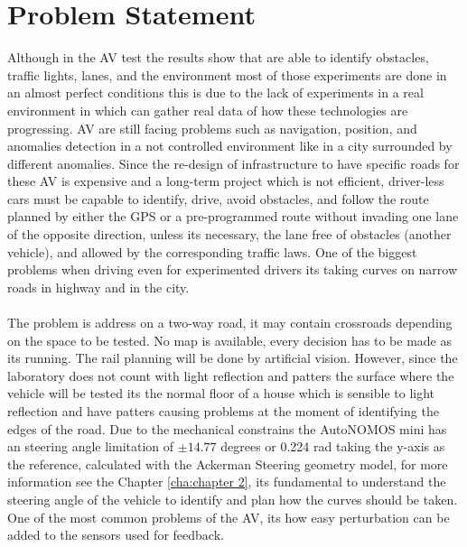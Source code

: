 \section{Problem Statement}
Although in the AV test the results show that are able to identify obstacles, traffic lights, lanes, and the environment most of those experiments are done in an almost perfect conditions this is due to the lack of experiments in a real environment in which can gather real data of how these technologies are progressing. AV are still facing problems such as navigation, position, and anomalies detection in a not controlled environment like in a city surrounded by different anomalies. Since the re-design of infrastructure to have specific roads for these AV is expensive and a long-term project which is not efficient, driver-less cars must be capable to identify, drive, avoid obstacles, and follow the route planned by either the GPS or a pre-programmed route without invading one lane of the opposite direction, unless its necessary, the lane free of obstacles (another vehicle), and allowed by the corresponding traffic laws. One of the biggest problems when driving even for experimented drivers its taking curves on narrow roads in highway and in the city.\\
\\The problem is address on a two-way road, it may contain crossroads depending on the space to be tested. No map is available, every decision has to be made as its running. The rail planning will be done by artificial vision. However, since the laboratory does not count with light reflection and patters the surface where the vehicle will be tested its the normal floor of a house which is sensible to light reflection and have patters causing problems at the moment of identifying the edges of the road. Due to the mechanical constrains the AutoNOMOS mini has an steering angle limitation of $\pm14.77$ degrees or 0.224 rad taking the y-axis as the reference, calculated with the Ackerman Steering geometry model, for more information see the Chapter \ref{cha:chapter 2}, its fundamental to understand the steering angle of the vehicle to identify and plan how the curves should be taken. One of the most common problems of the AV, its how easy perturbation can be added to the sensors used for feedback. 

